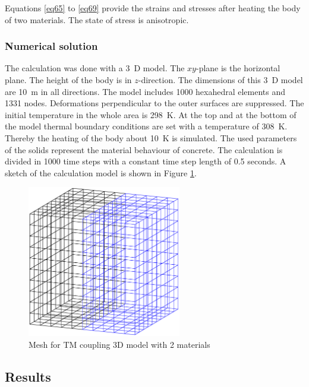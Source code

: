 Equations \eqref{eq65} to \eqref{eq69} provide the strains and stresses after heating the body of two materials. The state of stress is anisotropic.


\subsubsection{Numerical solution}
The calculation was done with a 3~D model. The $xy$-plane is the horizontal plane. The height of the body is in $z$-direction. The dimensions of this 3~D model are 10~m in all directions. The model includes 1000 hexahedral elements and 1331 nodes. Deformations perpendicular to the outer surfaces are suppressed. 
The initial temperature in the whole area is 298~K. At the top and at the bottom of the model thermal boundary conditions are set with a temperature of 308~K. Thereby the heating of the body about 10~K is simulated. The used parameters of the solids represent the material behaviour of concrete. The calculation is divided in 1000 time steps with a constant time step length of 0.5 seconds. A sketch of the calculation model is shown in Figure \ref{fig65}.

\begin{figure}[htbp]
\centering
\includegraphics[width=0.6\textwidth]{PART_III/TM/figures/fig65}
\caption{Mesh for TM coupling 3D model with 2 materials}
\label{fig65}
\end{figure}



\subsection{Results}

